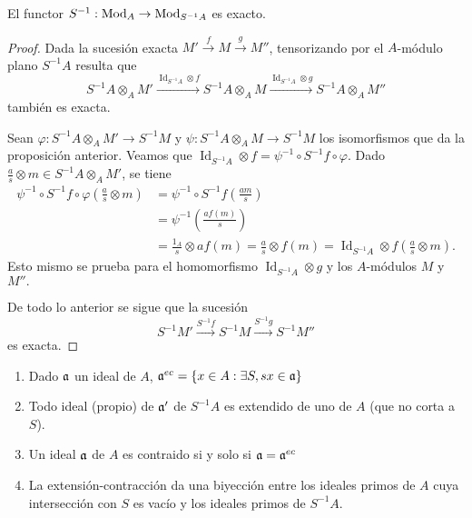 \documentclass[../main.tex]{subfiles}
\begin{document}
	\begin{corollary}
		El functor $S^{-1}:\operatorname{Mod}_A \to \operatorname{Mod}_{S^{-1}A}$ es exacto.
	\end{corollary}
	\begin{proof}
		Dada la sucesión exacta $M'\overset{f}{\longrightarrow}M\overset{g}{\longrightarrow}M''$, tensorizando por el $A$-módulo plano $S^{-1}A$ resulta que
		$$S^{-1}A\otimes_AM'\overset{\operatorname{Id}_{S^{-1}A}\otimes f}{\longrightarrow}S^{-1}A\otimes_AM\overset{\operatorname{Id}_{S^{-1}A}\otimes g}{\longrightarrow}S^{-1}A\otimes_AM''$$
		también es exacta.

		Sean $\varphi:S^{-1}A\otimes_AM'\longrightarrow S^{-1}M$ y $\psi:S^{-1}A\otimes_AM\longrightarrow S^{-1}M$ los isomorfismos que da la proposición anterior. Veamos que $\operatorname{Id}_{S^{-1}A}\otimes f=\psi^{-1}\circ S^{-1}f\circ \varphi.$ Dado $\frac{a}{s}\otimes m\in S^{-1}A\otimes_A M'$, se tiene
		\begin{align*}
		\psi^{-1}\circ S^{-1}f\circ \varphi\left(\frac{a}{s}\otimes m\right)&=\psi^{-1}\circ S^{-1}f\left(\frac{am}{s}\right)\\
		&=\psi^{-1}\left(\frac{af(m)}{s}\right)\\
		&=\frac{1_A}{s}\otimes af(m)=\frac{a}{s}\otimes f(m)=\operatorname{Id}_{S^{-1}A}\otimes f\left(\frac{a}{s}\otimes m\right).
		\end{align*}
		Esto mismo se prueba para el homomorfismo $\operatorname{Id}_{S^{-1}A}\otimes g$ y los $A$-módulos $M$ y $M''.$

		De todo lo anterior se sigue que la sucesión
		$$S^{-1}M'\overset{S^{-1}f}{\longrightarrow}S^{-1}M\overset{S^{-1}g}{\longrightarrow}S^{-1}M''$$
		es exacta.
	\end{proof}
\begin{proposition}\label{ideales_fracciones}
\begin{enumerate}
    \item Dado $\mathfrak{a}$ un ideal de $A$, $\mathfrak{a}^{ec}=\{x\in A:\exists S, sx\in\mathfrak{a}\}$
    \item Todo ideal (propio) de $\mathfrak{a}'$ de $S^{-1}A$ es extendido de uno de $A$ (que no corta a $S$).
    \item Un ideal $\mathfrak{a}$ de $A$ es contraido si y solo si $\mathfrak{a}=\mathfrak{a}^{ec}$
    \item La extensión-contracción da una biyección entre los ideales primos de $A$ cuya intersección con $S$ es vacío y los ideales primos de $S^{-1}A$.
\end{enumerate}
\end{proposition}
\end{document}
